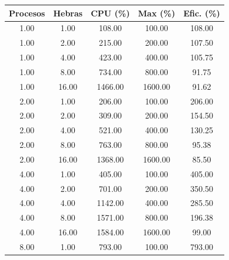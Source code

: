 \begin{table}[ht]
    \centering
    \begin{tabular}{|c|c|c|c|c|}
        \hline
        \textbf{Procesos} & \textbf{Hebras} & \textbf{CPU (\%)} & \textbf{Max (\%)} & \textbf{Efic. (\%)} \\
        \hline
        1.00              & 1.00            & 108.00            & 100.00            & 108.00              \\
        1.00              & 2.00            & 215.00            & 200.00            & 107.50              \\
        1.00              & 4.00            & 423.00            & 400.00            & 105.75              \\
        1.00              & 8.00            & 734.00            & 800.00            & 91.75               \\
        1.00              & 16.00           & 1466.00           & 1600.00           & 91.62               \\
        2.00              & 1.00            & 206.00            & 100.00            & 206.00              \\
        2.00              & 2.00            & 309.00            & 200.00            & 154.50              \\
        2.00              & 4.00            & 521.00            & 400.00            & 130.25              \\
        2.00              & 8.00            & 763.00            & 800.00            & 95.38               \\
        2.00              & 16.00           & 1368.00           & 1600.00           & 85.50               \\
        4.00              & 1.00            & 405.00            & 100.00            & 405.00              \\
        4.00              & 2.00            & 701.00            & 200.00            & 350.50              \\
        4.00              & 4.00            & 1142.00           & 400.00            & 285.50              \\
        4.00              & 8.00            & 1571.00           & 800.00            & 196.38              \\
        4.00              & 16.00           & 1584.00           & 1600.00           & 99.00               \\
        8.00              & 1.00            & 793.00            & 100.00            & 793.00              \\

\end{tabular}
\end{table}
